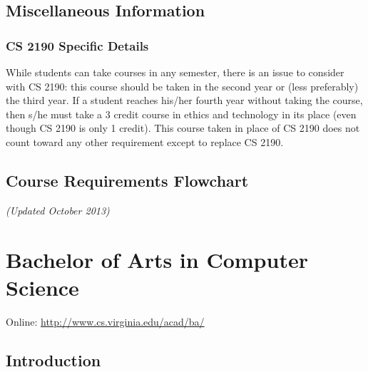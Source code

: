 \documentclass[10pt,letter,twocolumn]{book}
\newcommand{\mychapter}[2]{\chapter{#1}\renewcommand{\leftmark}{\textsc{#2}}}
\newcommand{\mysection}[1]{\section{#1}\renewcommand{\rightmark}{#1}}
\begin{document}


\mysection{Miscellaneous Information}
\subsection{CS 2190 Specific Details}

While students can take courses in any semester, there is an issue to
consider with CS 2190: this course should be taken in the second year
or (less preferably) the third year. If a student reaches his/her
fourth year without taking the course, then s/he must take a 3 credit
course in ethics and technology in its place (even though CS 2190 is
only 1 credit). This course taken in place of CS 2190 does not count
toward any other requirement except to replace CS 2190.

\clearpage%
\begin{figure*}[h!]
\mysection{Course Requirements Flowchart}
{\em (Updated October 2013)}
\begin{center}
\end{center}
\end{figure*}

\clearpage
\mychapter{Bachelor of Arts in Computer Science}{BA CS Degree}
\label{bacschapter}

\noindent Online: \url{http://www.cs.virginia.edu/acad/ba/}

\mysection{Introduction}
\end{document}
